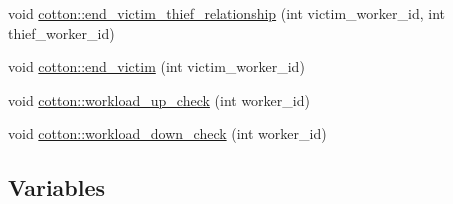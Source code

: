 \begin{DoxyCompactItemize}
\item 
void \mbox{\hyperlink{cotton-runtime_8h_a2faa5f098d14f1a3319101ff735bf016}{cotton\+::end\+\_\+victim\+\_\+thief\+\_\+relationship}} (int victim\+\_\+worker\+\_\+id, int thief\+\_\+worker\+\_\+id)
\item 
void \mbox{\hyperlink{cotton-runtime_8h_a824fc414cfcf95d0d928f9736490ab41}{cotton\+::end\+\_\+victim}} (int victim\+\_\+worker\+\_\+id)
\item 
void \mbox{\hyperlink{cotton-runtime_8h_aaffd00340decbd3395986d865ecc2660}{cotton\+::workload\+\_\+up\+\_\+check}} (int worker\+\_\+id)
\item 
void \mbox{\hyperlink{cotton-runtime_8h_adb1488633725b43a252652796faa2e98}{cotton\+::workload\+\_\+down\+\_\+check}} (int worker\+\_\+id)
\end{DoxyCompactItemize}
\subsection*{Variables}

